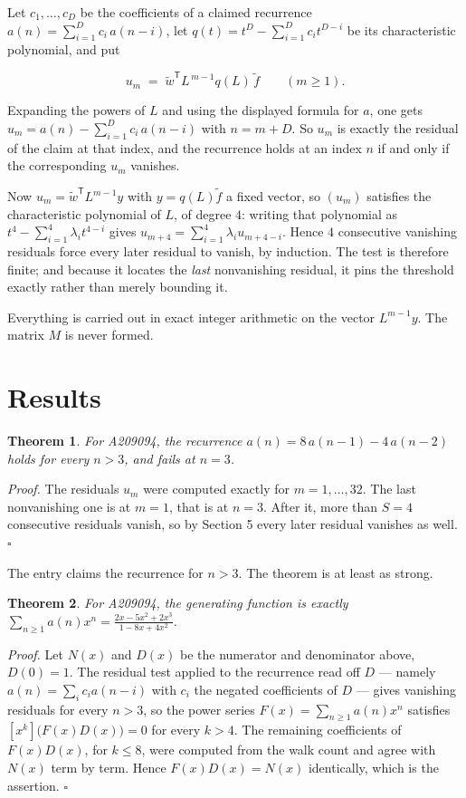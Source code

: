 \documentclass[11pt]{article}
\newtheorem{theorem}{Theorem}
\theoremstyle{definition}
\begin{document}
Let $c_1,\dots,c_D$ be the coefficients of a claimed recurrence $a(n) = \sum_{i=1}^{D} c_i\,a(n-i)$, let $q(t) = t^{D} - \sum_{i=1}^{D} c_i t^{D-i}$ be its characteristic polynomial, and put

\[u_m \;=\; \tilde w^{\mathsf T} L^{\,m-1} q(L)\,\tilde f \qquad (m \ge 1).\]

Expanding the powers of $L$ and using the displayed formula for $a$, one gets $u_m = a(n) - \sum_{i=1}^{D} c_i\,a(n-i)$ with $n = m + D$. So $u_m$ is exactly the residual of the claim at that index, and the recurrence holds at an index $n$ if and only if the corresponding $u_m$ vanishes.

Now $u_m = \tilde w^{\mathsf T} L^{m-1} y$ with $y = q(L)\tilde f$ a fixed vector, so $(u_m)$ satisfies the characteristic polynomial of $L$, of degree $4$: writing that polynomial as $t^{4} - \sum_{i=1}^{4} \lambda_i t^{4-i}$ gives $u_{m+4} = \sum_{i=1}^{4} \lambda_i u_{m+4-i}$. Hence $4$ consecutive vanishing residuals force every later residual to vanish, by induction. The test is therefore finite; and because it locates the {\itshape last} nonvanishing residual, it pins the threshold exactly rather than merely bounding it.

Everything is carried out in exact integer arithmetic on the vector $L^{m-1}y$. The matrix $M$ is never formed.

\section{Results}

\begin{theorem} For A209094, the recurrence $a(n) = 8\,a(n-1) - 4\,a(n-2)$ holds for every $n > 3$, and fails at $n = 3$.\end{theorem}

{\itshape Proof.} The residuals $u_m$ were computed exactly for $m = 1,\dots,32$. The last nonvanishing one is at $m = 1$, that is at $n = 3$. After it, more than $S = 4$ consecutive residuals vanish, so by Section 5 every later residual vanishes as well. $\square$

The entry claims the recurrence for $n > 3$. The theorem is at least as strong.

\begin{theorem} For A209094, the generating function is exactly $\sum_{n\ge 1} a(n)x^n = \frac{2x - 5x^{2} + 2x^{3}}{1 - 8x + 4x^{2}}$.\end{theorem}

{\itshape Proof.} Let $N(x)$ and $D(x)$ be the numerator and denominator above, $D(0)=1$. The residual test applied to the recurrence read off $D$ --- namely $a(n) = \sum_i c_i a(n-i)$ with $c_i$ the negated coefficients of $D$ --- gives vanishing residuals for every $n > 3$, so the power series $F(x)=\sum_{n\ge 1}a(n)x^n$ satisfies $[x^k]\bigl(F(x)D(x)\bigr) = 0$ for every $k > 4$. The remaining coefficients of $F(x)D(x)$, for $k \le 8$, were computed from the walk count and agree with $N(x)$ term by term. Hence $F(x)D(x) = N(x)$ identically, which is the assertion. $\square$
\end{document}
